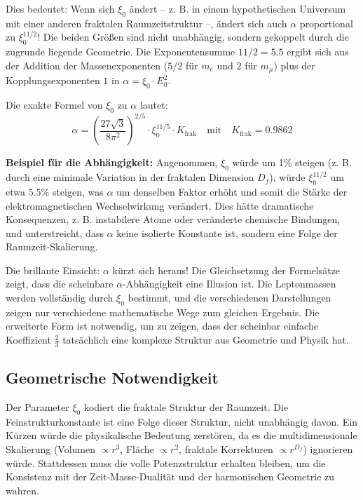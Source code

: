 \documentclass[12pt,a4paper]{article}
\newcommand{\xipar}{\xi_0}
\newcommand{\Ezero}{E_0}
\newcommand{\Dfrak}{D_f}
\begin{document}
	Dies bedeutet: Wenn sich $\xipar$ ändert – z. B. in einem hypothetischen Universum mit einer anderen fraktalen Raumzeitstruktur –, ändert sich auch $\alpha$ proportional zu $\xipar^{11/2}$! Die beiden Größen sind nicht unabhängig, sondern gekoppelt durch die zugrunde liegende Geometrie. Die Exponentensumme $11/2 = 5.5$ ergibt sich aus der Addition der Massenexponenten ($5/2$ für $m_e$ und $2$ für $m_\mu$) plus der Kopplungsexponenten $1$ in $\alpha = \xipar \cdot \Ezero^2$.
	
	Die exakte Formel von $\xipar$ zu $\alpha$ lautet:
	\begin{equation}
		\boxed{\alpha = \left(\frac{27\sqrt{3}}{8\pi^2}\right)^{2/5} \cdot \xipar^{11/5} \cdot K_{\text{frak}}}
		\quad \text{mit} \quad K_{\text{frak}} = 0.9862
	\end{equation}
	
	\textbf{Beispiel für die Abhängigkeit:} Angenommen, $\xipar$ würde um 1\% steigen (z. B. durch eine minimale Variation in der fraktalen Dimension $\Dfrak$), würde $\xipar^{11/2}$ um etwa $5.5\%$ steigen, was $\alpha$ um denselben Faktor erhöht und somit die Stärke der elektromagnetischen Wechselwirkung verändert. Dies hätte dramatische Konsequenzen, z. B. instabilere Atome oder veränderte chemische Bindungen, und unterstreicht, dass $\alpha$ keine isolierte Konstante ist, sondern eine Folge der Raumzeit-Skalierung.
	
	Die brillante Einsicht: $\alpha$ kürzt sich heraus! Die Gleichsetzung der Formelsätze zeigt, dass die scheinbare $\alpha$-Abhängigkeit eine Illusion ist. Die Leptonmassen werden vollständig durch $\xipar$ bestimmt, und die verschiedenen Darstellungen zeigen nur verschiedene mathematische Wege zum gleichen Ergebnis. Die erweiterte Form ist notwendig, um zu zeigen, dass der scheinbar einfache Koeffizient $\frac{2}{3}$ tatsächlich eine komplexe Struktur aus Geometrie und Physik hat.
	
	\subsection{Geometrische Notwendigkeit}
	
	Der Parameter $\xipar$ kodiert die fraktale Struktur der Raumzeit. Die Feinstrukturkonstante ist eine Folge dieser Struktur, nicht unabhängig davon. Ein Kürzen würde die physikalische Bedeutung zerstören, da es die multidimensionale Skalierung (Volumen $\propto r^3$, Fläche $\propto r^2$, fraktale Korrekturen $\propto r^{\Dfrak}$) ignorieren würde. Stattdessen muss die volle Potenzstruktur erhalten bleiben, um die Konsistenz mit der Zeit-Masse-Dualität und der harmonischen Geometrie zu wahren.
	
\end{document}
